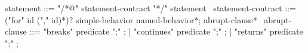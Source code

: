 \begin{syntax}
  statement ::= "/*@" statement-contract "*/" statement
  \
  statement-contract ::= {("for" id ("," id)*)?}
    simple-behavior named-behavior*;
    {abrupt-clause*}
  \
  abrupt-clause ::= {"breaks" predicate ";"} ;
  | {"continues" predicate ";"} ;
  | {"returns" predicate ";"} ;
\end{syntax}
